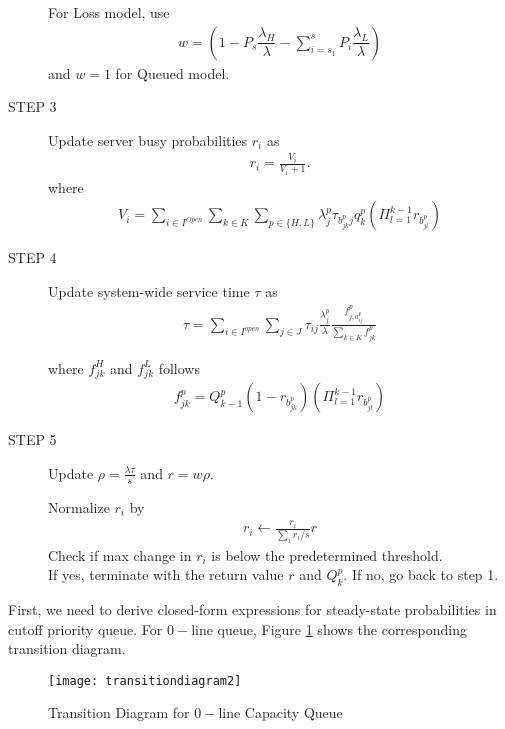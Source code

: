 \documentclass{article}
\begin{document}
\begin{description}
For Loss model, use
\begin{align}
w = (1-P_s \dfrac{\lambda_H}{\lambda}-\sum_{i=s_1}^s P_{i} \dfrac{\lambda_L}{\lambda})
\end{align}
and $w=1$ for Queued model.


\item[STEP 3] Update server busy probabilities $r_i$ as
\begin{align}
r_i = \frac{V_i}{V_i+1}.
\end{align}
where
\begin{align}
V_i = \sum_{i \in I^{Open}} \sum_{k \in K} \sum_{p \in \{H,L\}} \lambda^p_j \tau_{b^p_{jk}j} q^p_k (\Pi^{k-1}_{l=1} r_{b^p_{jl}})
\end{align}


\item[STEP 4] Update system-wide service time $\tau$ as
\begin{align}
\tau = \sum_{i \in I^{open}} \sum_{j \in J} \tau_{ij} \frac{\lambda^p_j}{\lambda}\frac{f^p_{j,a^p_{ij}}}{\sum_{k \in K} f^p_{jk}}
\end{align}

where $f^H_{jk}$ and $f^L_{jk}$ follows
\begin{align}
f^p_{jk} = Q^p_{k-1} (1-r_{b^p_{jk}}) (\Pi^{k-1}_{l=1} r_{b^p_{jl}})
\end{align}

\item[STEP 5] Update $\rho=\frac{\lambda \tau}{s}$ and $r = w \rho$.

Normalize $r_i$ by
\begin{align}
r_i \leftarrow \frac{r_i}{\sum_i r_i/s} r
\end{align}
Check if max change in $r_i$ is below the predetermined threshold. \\
If yes, terminate with the return value $r$ and $Q_k^p$. If no, go back to step 1.

\end{description}

First, we need to derive closed-form expressions for steady-state probabilities in cutoff priority queue. For $0-$line queue, Figure \ref{fig:transitiondiagram} shows the corresponding transition diagram.

\begin{figure}
\centering
\texttt{[image: transitiondiagram2]}
\caption{Transition Diagram for $0-$line Capacity Queue}
\label{fig:transitiondiagram}
\end{figure}
\end{document}
